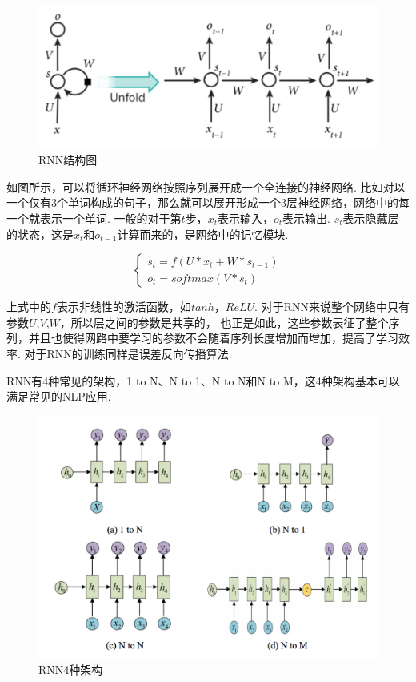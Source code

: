 \documentclass[bachelor,adobefonts]{jnuthesis}
\begin{document}
\begin{figure}[h!]
  \centering
  \includegraphics[width=0.6\linewidth]{RNN.png}
  \caption{RNN结构图}
\end{figure}

如图所示，可以将循环神经网络按照序列展开成一个全连接的神经网络.
比如对以一个仅有3个单词构成的句子，那么就可以展开形成一个3层神经网络，网络中的每一个就表示一个单词.
一般的对于第$t$步，$x_{t}$表示输入，$o_{t}$表示输出.
$s_{t}$表示隐藏层的状态，这是$x_{t}$和$o_{t-1}$计算而来的，是网络中的记忆模块.

\begin{equation}
  \left\{
  \begin{array}{l}
    s_{t} = f(U*x_{t}+W*s_{t-1}) \\
    o_{t} = softmax(V*s_{t})
  \end{array}
  \right.
\end{equation}

上式中的$f$表示非线性的激活函数，如$tanh$，$ReLU$.
对于RNN来说整个网络中只有参数$U$,$V$,$W$，所以层之间的参数是共享的，
也正是如此，这些参数表征了整个序列，并且也使得网路中要学习的参数不会随着序列长度增加而增加，提高了学习效率.
对于RNN的训练同样是误差反向传播算法.

RNN有4种常见的架构，1 to N、N to 1、N to N和N to M，这4种架构基本可以满足常见的NLP应用.

\begin{figure}[h!]
  \centering
  \includegraphics[width=0.65\linewidth]{4种架构.png}
  \caption{RNN4种架构}
\end{figure}
\end{document}
